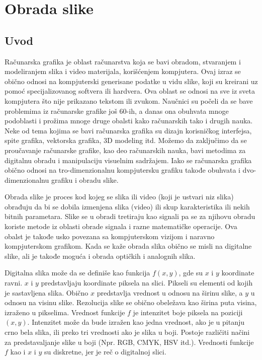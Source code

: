 \documentclass[a4paper,12pt,titlepage]{article}
\begin{document}
\section{Obrada slike}%

\subsection{Uvod}%

Računarska grafika je oblast računarstva koja se bavi obradom, stvaranjem i modeliranjem slika i video materijala, korišćenjem kompjutera. 
Ovaj izraz se obično odnosi na kompjuterski generisane podatke u vidu slike, koji su kreirani uz pomoć specijalizovanog softvera ili hardvera.
Ova oblast se odnosi na sve iz sveta kompjutera što nije prikazano tekstom ili zvukom.
Naučnici su počeli da se bave problemima iz računarske grafike još 60-ih, a danas ona obuhvata mnoge podoblasti i prožima mnoge druge
obalsti kako računarskih tako i drugih nauka. Neke od tema kojima se bavi računarska grafika su dizajn korisničkog interfejsa, spite grafika, vektorska grafika, 3D modeling itd. Možemo da zaključimo da se proučavanje računarske grafike, kao deo računarskih nauka, bavi metodima
za digitalnu obradu i manipulaciju visuelnim sadržajem. Iako se računarska grafika obično odnosi na tro-dimenzionalnu kompjutersku grafiku
takođe obuhvata i dvo-dimenzionalnu grafiku i obradu slike. 

Obrada slike je proces kod kojeg se slika ili video (koji je ustvari niz slika) obrađuju da bi se dobila izmenjena slika (video) ili skup karakteristika
ili nekih bitnih parametara. Slike se u obradi tretiraju kao signali pa se za njihovu obradu koriste metode iz oblasti obrade signala i razne matematičke operacije. Ova obalst je takođe usko povezana sa kompjuterskom vizijom i naravno kompjuterskom grafikom. Kada se kaže obrada slika obično se misli na digitalne slike, ali je takođe moguća i obrada optičkih i analognih slika. 

Digitalna slika može da se definiše kao funkcija $f(x, y)$, gde su $x$ i $y$ koordinate ravni. $x$ i $y$ predstavljaju koordinate piksela na slici. Pikseli su elementi od kojih je sastavljena slika. Obično $x$ predstavlja vrednost u odnosu na širinu slike, a $y$ u odnosu na visinu slike. Rezolucija slike se obično obeležava kao širina puta visina, izraženo u pikselima. Vrednost funkcije $f$ je intenzitet boje piksela na poziciji $(x, y)$. Intenzitet može da bude izražen kao jedna vrednost, ako je u pitanju crno bela slika, ili preko tri vrednosti ako je slika u boji. Postoje različiti načini za predstavaljanje slike u boji (Npr. RGB, CMYK, HSV itd.). Vrednosti funkcije $f$ kao i $x$ i $y$ su diskretne, jer je reč o digitalnoj slici. 
\end{document}

